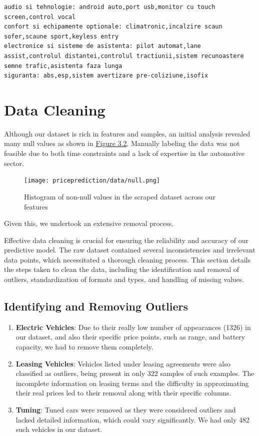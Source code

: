 \begin{lstlisting}[caption={Custom Options for concatenation}, label={lst:description-after}, language={}]
audio si tehnologie: android auto,port usb,monitor cu touch screen,control vocal
confort si echipamente optionale: climatronic,incalzire scaun sofer,scaune sport,keyless entry
electronice si sisteme de asistenta: pilot automat,lane assist,controlul distantei,controlul tractiunii,sistem recunoastere semne trafic,asistenta faza lunga
siguranta: abs,esp,sistem avertizare pre-coliziune,isofix
\end{lstlisting}

\section{Data Cleaning}
\label{sec:data-cleaning}

Although our dataset is rich in features and samples, an initial analysis revealed many null values as shown in \hyperref[fig:scraped-null]{Figure 3.2}. Manually labeling the data was not feasible due to both time constraints and a lack of expertise in the automotive sector.

\begin{figure}[ht]
\centering
\label{fig:scraped-null}
\texttt{[image: priceprediction/data/null.png]}
\caption{Histogram of non-null values in the scraped dataset across our features}
\end{figure}

Given this, we undertook an extensive removal process.

Effective data cleaning is crucial for ensuring the reliability and accuracy of our predictive model. The raw dataset contained several inconsistencies and irrelevant data points, which necessitated a thorough cleaning process. This section details the steps taken to clean the data, including the identification and removal of outliers, standardization of formats and types, and handling of missing values.

\subsection{Identifying and Removing Outliers}
\begin{enumerate}
    \item \textbf{Electric Vehicles}: Due to their really low number of appearances (1326) in our dataset, and also their specific price points, such as range, and battery capacity, we had to remove them completely.
    \item \textbf{Leasing Vehicles}: Vehicles listed under leasing agreements were also classified as outliers, being present in only 322 samples of such examples. The incomplete information on leasing terms and the difficulty in approximating their real prices led to their removal along with their specific columns.
    \item \textbf{Tuning}: Tuned cars were removed as they were considered outliers and lacked detailed information, which could vary significantly. We had only 482 such vehicles in our dataset.
\end{enumerate}

